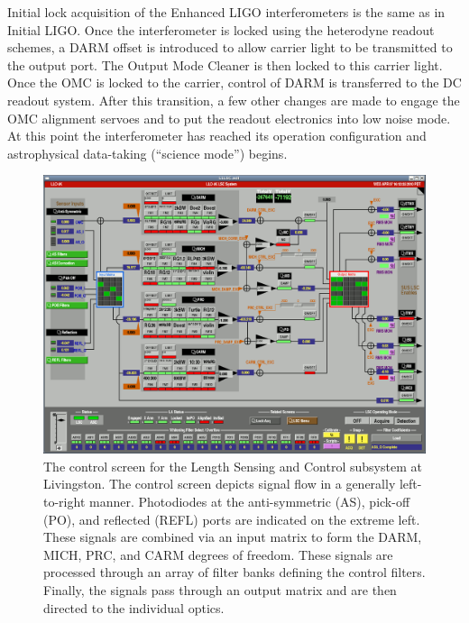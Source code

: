 
Initial lock acquisition of the Enhanced LIGO interferometers is the
same as in Initial LIGO\cite{Evans2002Lock}. Once the interferometer is locked using the
heterodyne readout schemes, a DARM offset is introduced to allow carrier
light to be transmitted to the output port. The Output Mode Cleaner
is then locked to this carrier light. Once the OMC is locked to the
carrier, control of DARM is transferred to the DC readout system.
After this transition, a few other changes are made to engage the
OMC alignment servoes and to put the readout electronics into low
noise mode. At this point the interferometer has reached its operation
configuration and astrophysical data-taking ({}``science mode'')
begins.


\begin{figure}
\includegraphics[width=\columnwidth]{figures/L1LSC.png}
\caption{The control screen for the Length Sensing and Control
  subsystem at Livingston.  The control screen depicts signal flow in
  a generally left-to-right manner.  Photodiodes at the anti-symmetric
  (AS), pick-off (PO), and reflected (REFL) ports are indicated on the
  extreme left.  These signals are combined via an input matrix to
  form the DARM, MICH, PRC, and CARM degrees of freedom.  These
  signals are processed through an array of filter banks defining the
  control filters.  Finally, the signals pass through an output matrix
  and are then directed to the individual optics.}
\end{figure}


